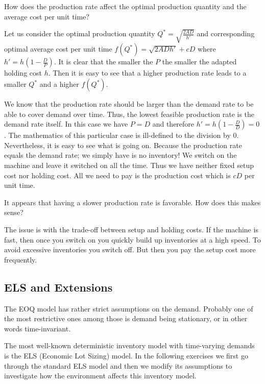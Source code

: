 \begin{question}
How does the production rate affect the optimal production quantity and the average cost per unit time?
\end{question}

\begin{solution}
Let us consider the optimal production quantity $Q^*=\sqrt{\frac{2AD}{h'}}$ and corresponding optimal average cost per unit time $f(Q^*)=\sqrt{2ADh'}+cD$ where $h'=h\left(1-\frac{D}{P}\right)$. It is clear that the smaller the $P$ the smaller the adapted holding cost $h$. Then it is easy to see that a higher production rate leads to a smaller $Q^*$ and a higher $f(Q^*)$. 

We know that the production rate should be larger than the demand rate to be able to cover demand over time. Thus, the lowest feasible production rate is the demand rate itself. In this case we have $P=D$ and therefore $h'=h\left(1-\frac{D}{D}\right)=0$. The mathematics of this particular case is ill-defined to the division by 0. Nevertheless, it is easy to see what is going on. Because the production rate equals the demand rate; we simply have is no inventory! We switch on the machine and leave it switched on all the time. Thus we have neither fixed setup cost nor holding cost. All we need to pay is the production cost which is $cD$ per unit time.
\end{solution}

\begin{question}
It appears that having a slower production rate is favorable. How does this makes sense?
\end{question}
\begin{solution}
The issue is with the trade-off between setup and holding costs. If the machine is fast, then once you switch on you quickly build up inventories at a high speed. To avoid excessive inventories you switch off. But then you pay the setup cost more frequently. 
\end{solution}


\subsection{ELS and Extensions}

The EOQ model has rather strict assumptions on the demand. Probably one of the most restrictive ones among those is demand being stationary, or in other words time-invariant.

The most well-known deterministic inventory model with time-varying demands is the ELS (Economic Lot Sizing) model. In the following exercises we first go through the standard ELS model and then we modify its assumptions to investigate how the environment affects this inventory model. 

